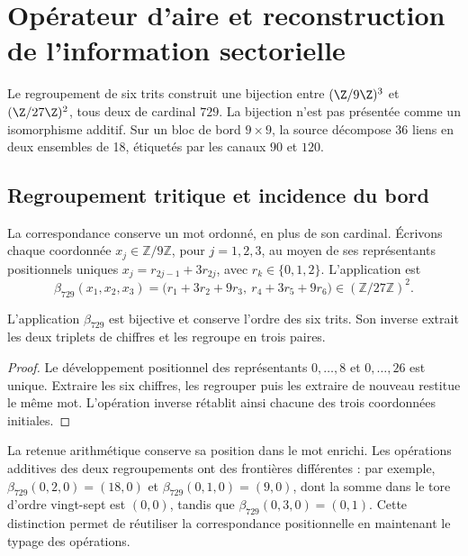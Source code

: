 \section{Opérateur d'aire et reconstruction de l'information sectorielle}
\label{ii:sec:area}
Le regroupement de six trits construit une bijection entre
$(\Z/9\Z)^3$ et $(\Z/27\Z)^2$, tous deux de cardinal $729$.
La bijection n'est pas présentée comme un isomorphisme additif. Sur un bloc
de bord $9\times9$, la source décompose 36 liens en deux
ensembles de 18, étiquetés par les canaux $90$ et $120$.

\subsection{Regroupement tritique et incidence du bord}
\label{ii:sec:ii-area-incidencia-explicita}

La correspondance conserve un mot ordonné, en plus de son cardinal.
Écrivons chaque coordonnée \(x_j\in\mathbb Z/9\mathbb Z\), pour
\(j=1,2,3\), au moyen de ses représentants positionnels uniques
\(x_j=r_{2j-1}+3r_{2j}\), avec \(r_k\in\{0,1,2\}\). L'application est
\begin{equation}
 \beta_{729}(x_1,x_2,x_3)
 =\bigl(r_1+3r_2+9r_3,\ r_4+3r_5+9r_6\bigr)
 \in(\mathbb Z/27\mathbb Z)^2.
 \label{ii:eq:ii-area-beta729}
\end{equation}

\begin{proposition}
\label{ii:prop:ii-area-beta729}
L'application \(\beta_{729}\) est bijective et conserve l'ordre des
six trits. Son inverse extrait les deux triplets de chiffres et les regroupe
en trois paires.
\end{proposition}
\begin{proof}
Le développement positionnel des représentants \(0,\ldots,8\) et
\(0,\ldots,26\) est unique. Extraire les six chiffres, les regrouper puis
les extraire de nouveau restitue le même mot. L'opération inverse
rétablit ainsi chacune des trois coordonnées initiales.
\end{proof}

La retenue arithmétique conserve sa position dans le mot enrichi. Les opérations
additives des deux regroupements ont des frontières différentes : par exemple,
\(\beta_{729}(0,2,0)=(18,0)\) et
\(\beta_{729}(0,1,0)=(9,0)\), dont la somme dans le tore d'ordre
vingt-sept est \((0,0)\), tandis que
\(\beta_{729}(0,3,0)=(0,1)\). Cette distinction permet de réutiliser
la correspondance positionnelle en maintenant le typage des opérations.

